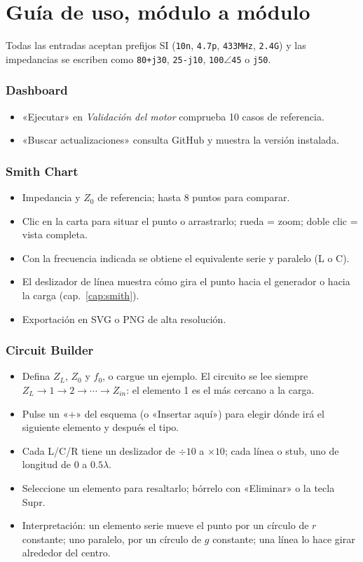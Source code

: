 \chapter{Guía de uso, módulo a módulo}

Todas las entradas aceptan prefijos SI (\texttt{10n}, \texttt{4.7p}, \texttt{433MHz}, \texttt{2.4G}) y las impedancias se escriben como
\texttt{80+j30}, \texttt{25-j10}, \texttt{100}$\angle$\texttt{45} o \texttt{j50}.

\newcommand{\modulo}[2]{\subsection*{#1}\begin{itemize}#2\end{itemize}}

\modulo{Dashboard}{
\item «Ejecutar» en \emph{Validación del motor} comprueba 10 casos de referencia.
\item «Buscar actualizaciones» consulta GitHub y muestra la versión instalada.}

\modulo{Smith Chart}{
\item Impedancia y $Z_0$ de referencia; hasta 8 puntos para comparar.
\item Clic en la carta para situar el punto o arrastrarlo; rueda = zoom; doble clic = vista completa.
\item Con la frecuencia indicada se obtiene el equivalente serie y paralelo (L o C).
\item El deslizador de línea muestra cómo gira el punto hacia el generador o hacia la carga (cap.~\ref{cap:smith}).
\item Exportación en SVG o PNG de alta resolución.}

\modulo{Circuit Builder}{
\item Defina $Z_L$, $Z_0$ y $f_0$, o cargue un ejemplo. El circuito se lee siempre $Z_L \to 1 \to 2 \to\cdots\to Z_{in}$: el elemento 1 es el
más cercano a la carga.
\item Pulse un «+» del esquema (o «Insertar aquí») para elegir dónde irá el siguiente elemento y después el tipo.
\item Cada L/C/R tiene un deslizador de $\div10$ a $\times10$; cada línea o stub, uno de longitud de 0 a $0.5\lambda$.
\item Seleccione un elemento para resaltarlo; bórrelo con «Eliminar» o la tecla Supr.
\item Interpretación: un elemento serie mueve el punto por un círculo de $r$ constante; uno paralelo, por un círculo de $g$ constante;
una línea lo hace girar alrededor del centro.}

